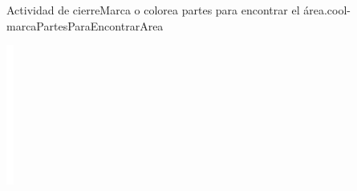 \documentclass[14pt]{extarticle}
\begin{document}
\begin{project}{Actividad de cierre}{Marca o colorea partes para encontrar el área.}{cool-marcaPartesParaEncontrarArea}
\begin{image}{0}{1}{0}{}
\includegraphics[max width=\linewidth, center]{external/whitespace-tikz/3cm.pdf}
\end{image}%
\end{project}
\end{document}
